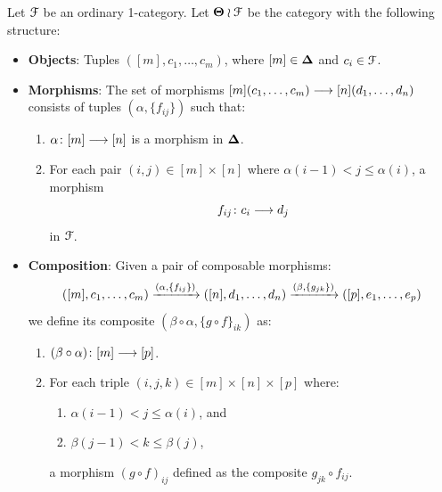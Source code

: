 \begin{definition}
    Let $\mathcal F$ be an ordinary 1-category. Let $\mathbf\Theta \wr \mathcal F$ be the category with the following structure:
    \begin{itemize}
        \item \textbf{Objects}: Tuples $([m],c_1,\ldots,c_m)$, where $[m]\in \mathbf\Delta$ and $c_i \in \mathcal F$.
        \item \textbf{Morphisms}: The set of morphisms $[m](c_1,\ldots,c_m) \longrightarrow [n](d_1,\ldots,d_n)$ consists of tuples $(\alpha,\{f_{ij}\})$ such that:
        \begin{enumerate}
            \item $\alpha \colon [m] \longrightarrow [n]$ is a morphism in $\mathbf\Delta$.
            \item For each pair $(i,j)\in [m]\times [n]$ where $\alpha(i-1) < j \leq \alpha(i)$, a morphism 
            \begin{equation}
                f_{ij} \colon c_i \longrightarrow d_j
            \end{equation}
            in $\mathcal F$. 
        \end{enumerate}
        \item \textbf{Composition}: Given a pair of composable morphisms:
        \begin{equation}
            ([m],c_1,\ldots,c_m) \xrightarrow{(\alpha,\{f_{ij}\})} ([n],d_1,\ldots,d_n) \xrightarrow{(\beta,\{g_{jk}\})}
            ([p],e_1,\ldots,e_p)
        \end{equation}
        we define its composite $(\beta\circ \alpha, \{g \circ f\}_{ik})$ as:
        \begin{enumerate}
            \item $(\beta \circ \alpha) \colon [m] \longrightarrow [p]$.
            \item For each triple $(i,j,k) \in [m] \times [n] \times [p]$ where:
            \begin{enumerate}
                \item $\alpha(i-1) < j \leq \alpha(i)$, and
                \item $\beta(j-1) < k \leq \beta(j)$,
            \end{enumerate}
            a morphism $(g \circ f)_{ij}$ defined as the composite $g_{jk}\circ f_{ij}$. 
        \end{enumerate}
    \end{itemize} 
\end{definition}

